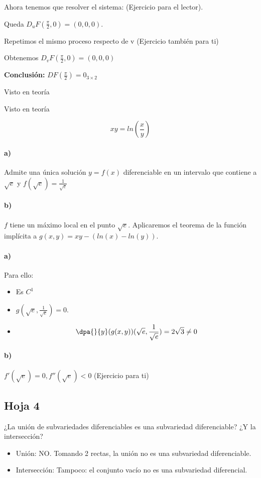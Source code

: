 \begin{problem}[19]
Ahora tenemos que resolver el sistema:
(Ejercicio para el lector). 

Queda $D_uF(\frac{\pi}{2},0)  = (0,0,0)$.

Repetimos el mismo proceso respecto de v (Ejercicio también para ti)

Obtenemos $D_vF(\frac{\pi}{2},0)  = (0,0,0)$

\textbf{Conclusión:} $DF(\frac{\pi}{2}) = 0_{3\times 2}$
\end{problem}

 \begin{problem}[20]
 \solution
 Visto en teoría
 \end{problem}
 
  \begin{problem}[21]
 \solution
 Visto en teoría
 \end{problem}
 
 
\begin{problem}[24]
\[xy = ln\left(\frac{x}{y}\right)\]
\paragraph{a)} Admite una única solución $y=f(x)$ diferenciable en un intervalo que contiene a $\sqrt{e}$ y $f(\sqrt{e}) = \frac{1}{\sqrt{e}}$
\paragraph{b)} $f$ tiene un máximo local en el punto $\sqrt{e}$.
\solution
Aplicaremos el teorema de la función implícita a $g(x,y)=xy-\left(ln(x)-ln(y)\right)$.
\paragraph{a)}
Para ello:
\begin{itemize}
\item Es $C^1$
\item $g(\sqrt{e},\frac{1}{\sqrt{e}}) = 0$.
\item
\[\dpa{}{y}(g(x,y)) (\sqrt{e},\frac{1}{\sqrt{e}}) = 2\sqrt{3}\neq 0\]
\end{itemize}

\paragraph{b)}
$f'(\sqrt{e}) = 0, f''(\sqrt{e})<0$ (Ejercicio para ti)
\end{problem}


\subsection{Hoja 4}
\begin{problem} [1]
¿La unión de subvariedades diferenciables es una subvariedad diferenciable? ¿Y la intersección?
\solution
\begin{itemize}
\item Unión: NO. Tomando 2 rectas, la unión no es una subvariedad diferenciable.
\item Intersección: Tampoco: el conjunto vacío no es una subvariedad diferencial.
\end{itemize}
\end{problem}

